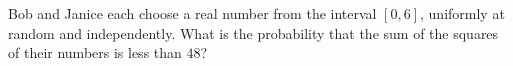 Bob and Janice each choose a real number from the interval $[0,6]$, uniformly at random and independently. What is the probability that the sum of the squares of their numbers is less than $48$?
